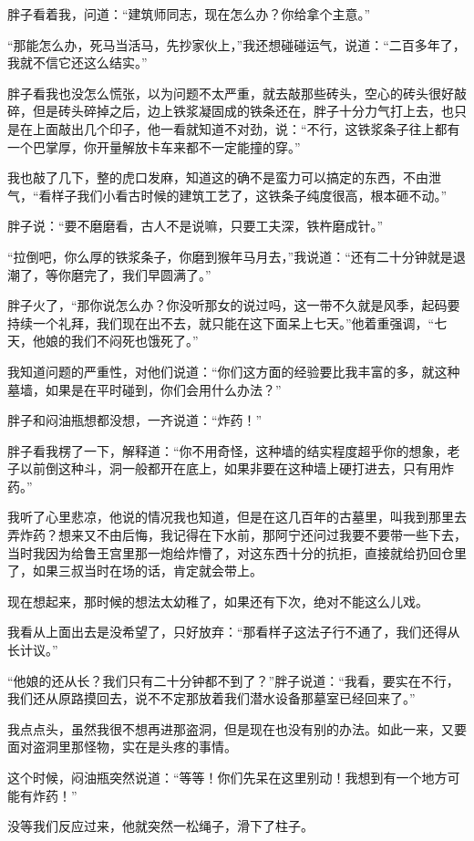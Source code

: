 胖子看着我，问道：“建筑师同志，现在怎么办？你给拿个主意。”

“那能怎么办，死马当活马，先抄家伙上，”我还想碰碰运气，说道：“二百多年了，我就不信它还这么结实。”

胖子看我也没怎么慌张，以为问题不太严重，就去敲那些砖头，空心的砖头很好敲碎，但是砖头碎掉之后，边上铁浆凝固成的铁条还在，胖子十分力气打上去，也只是在上面敲出几个印子，他一看就知道不对劲，说：“不行，这铁浆条子往上都有一个巴掌厚，你开量解放卡车来都不一定能撞的穿。”

我也敲了几下，整的虎口发麻，知道这的确不是蛮力可以搞定的东西，不由泄气，“看样子我们小看古时候的建筑工艺了，这铁条子纯度很高，根本砸不动。”

胖子说：“要不磨磨看，古人不是说嘛，只要工夫深，铁杵磨成针。”

“拉倒吧，你么厚的铁浆条子，你磨到猴年马月去，”我说道：“还有二十分钟就是退潮了，等你磨完了，我们早圆满了。”

胖子火了，“那你说怎么办？你没听那女的说过吗，这一带不久就是风季，起码要持续一个礼拜，我们现在出不去，就只能在这下面呆上七天。”他着重强调，“七天，他娘的我们不闷死也饿死了。”

我知道问题的严重性，对他们说道：“你们这方面的经验要比我丰富的多，就这种墓墙，如果是在平时碰到，你们会用什么办法？”

胖子和闷油瓶想都没想，一齐说道：“炸药！”

胖子看我楞了一下，解释道：“你不用奇怪，这种墙的结实程度超乎你的想象，老子以前倒这种斗，洞一般都开在底上，如果非要在这种墙上硬打进去，只有用炸药。”

我听了心里悲凉，他说的情况我也知道，但是在这几百年的古墓里，叫我到那里去弄炸药？想来又不由后悔，我记得在下水前，那阿宁还问过我要不要带一些下去，当时我因为给鲁王宫里那一炮给炸懵了，对这东西十分的抗拒，直接就给扔回仓里了，如果三叔当时在场的话，肯定就会带上。

现在想起来，那时候的想法太幼稚了，如果还有下次，绝对不能这么儿戏。

我看从上面出去是没希望了，只好放弃：“那看样子这法子行不通了，我们还得从长计议。”

“他娘的还从长？我们只有二十分钟都不到了？”胖子说道：“我看，要实在不行，我们还从原路摸回去，说不不定那放着我们潜水设备那墓室已经回来了。”

我点点头，虽然我很不想再进那盗洞，但是现在也没有别的办法。如此一来，又要面对盗洞里那怪物，实在是头疼的事情。

这个时候，闷油瓶突然说道：“等等！你们先呆在这里别动！我想到有一个地方可能有炸药！”

没等我们反应过来，他就突然一松绳子，滑下了柱子。

